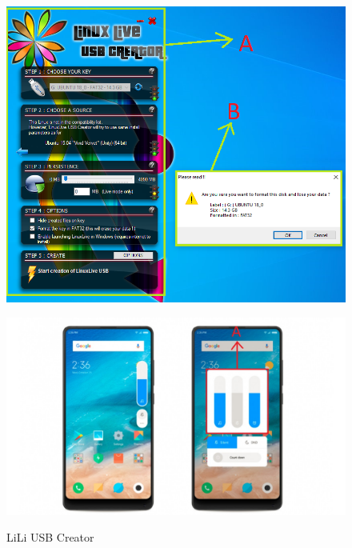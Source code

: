 \documentclass[a4paper,11pt,oneside]{scrreprt}
\begin{document}
\begin{figure}[H]
	\centering
	\begin{minipage}{.45\textwidth}
		\centering
		\includegraphics[clip, trim=0cm 0cm 0cm 0cm, scale=0.5]{./images/lili.png}
		\caption{LiLi USB Creator}
	\end{minipage}%
	\hspace*{3cm}\begin{minipage}{.45\textwidth}
		\centering
		\includegraphics[clip, trim=23cm 0cm 8cm 0cm, scale=0.35]{./images/miui.jpg}
		\label{fig:test2}
	\end{minipage}
\end{figure}
\end{document}
